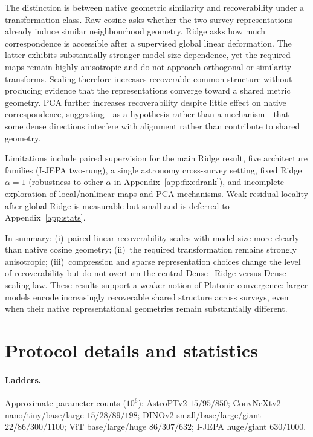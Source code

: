 \documentclass{article}
\begin{document}
The distinction is between native geometric similarity and recoverability under a transformation class.
Raw cosine asks whether the two survey representations already induce similar neighbourhood geometry.
Ridge asks how much correspondence is accessible after a supervised global linear deformation.
The latter exhibits substantially stronger model-size dependence, yet the required maps remain highly anisotropic and do not approach orthogonal or similarity transforms.
Scaling therefore increases recoverable common structure without producing evidence that the representations converge toward a shared metric geometry.
PCA further increases recoverability despite little effect on native correspondence, suggesting---as a hypothesis rather than a mechanism---that some dense directions interfere with alignment rather than contribute to shared geometry.

Limitations include paired supervision for the main Ridge result, five architecture families (I-JEPA two-rung), a single astronomy cross-survey setting, fixed Ridge \(\alpha{=}1\) (robustness to other \(\alpha\) in Appendix~\ref{app:fixedrank}), and incomplete exploration of local/nonlinear maps and PCA mechanisms.
Weak residual locality after global Ridge is measurable but small and is deferred to Appendix~\ref{app:stats}.

In summary: (i)~paired linear recoverability scales with model size more clearly than native cosine geometry;
(ii)~the required transformation remains strongly anisotropic;
(iii)~compression and sparse representation choices change the level of recoverability but do not overturn the central Dense+Ridge versus Dense scaling law.
These results support a weaker notion of Platonic convergence: larger models encode increasingly recoverable shared structure across surveys, even when their native representational geometries remain substantially different.

{\small


}

\appendix
\section{Protocol details and statistics}
\label{app:details}
\label{app:stats}

\paragraph{Ladders.}
Approximate parameter counts (\(10^{6}\)):
AstroPTv2 \(15/95/850\);
ConvNeXtv2 nano/tiny/base/large \(15/28/89/198\);
DINOv2 small/base/large/giant \(22/86/300/1100\);
ViT base/large/huge \(86/307/632\);
I-JEPA huge/giant \(630/1000\).
\end{document}
